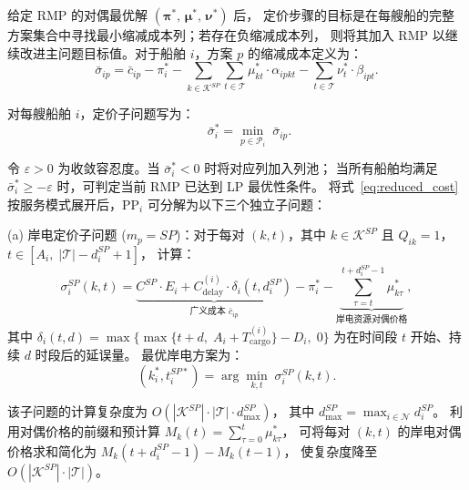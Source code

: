 \documentclass[UTF8, a4paper, 12pt]{ctexart}
\theoremstyle{plain}
\theoremstyle{definition}
\theoremstyle{remark}
\begin{document}
给定 RMP 的对偶最优解 $(\boldsymbol{\pi}^*,\, \boldsymbol{\mu}^*,\, \boldsymbol{\nu}^*)$ 后，
定价步骤的目标是在每艘船的完整方案集合中寻找最小缩减成本列；若存在负缩减成本列，
则将其加入 RMP 以继续改进主问题目标值。对于船舶 $i$，方案 $p$ 的缩减成本定义为：
\begin{equation}
  \bar{\sigma}_{ip}
  = \bar{c}_{ip}
  - \pi_i^*
  - \sum_{k \in \mathcal{K}^{SP}} \sum_{t \in \mathcal{T}}
    \mu_{kt}^* \cdot \alpha_{ipkt}
  - \sum_{t \in \mathcal{T}} \nu_t^* \cdot \beta_{ipt}.
  \label{eq:reduced_cost}
\end{equation}

对每艘船舶 $i$，定价子问题写为：
\begin{equation}
  [\text{PP}_i] \qquad
  \bar{\sigma}_i^* =
  \min_{p \in \mathcal{P}_i} \; \bar{\sigma}_{ip}.
  \label{eq:pricing}
\end{equation}

令 $\varepsilon>0$ 为收敛容忍度。当 $\bar{\sigma}_i^*<0$ 时将对应列加入列池；
当所有船舶均满足 $\bar{\sigma}_i^*\ge -\varepsilon$ 时，可判定当前 RMP 已达到 LP 最优性条件。
将式~\eqref{eq:reduced_cost} 按服务模式展开后，$\text{PP}_i$ 可分解为以下三个独立子问题：

\medskip
\noindent(a) 岸电定价子问题
($m_p = SP$)：对于每对 $(k, t)$，其中 $k \in \mathcal{K}^{SP}$
且 $Q_{ik} = 1$，$t \in [A_i,\; |\mathcal{T}| - d_i^{SP} + 1]$，
计算：
\begin{equation}
  \sigma_i^{SP}(k, t)
  = \underbrace{C^{SP} \cdot E_i + C_{\text{delay}}^{(i)} \cdot \delta_i(t, d_i^{SP})}_{
    \text{广义成本 } \bar{c}_{ip}}
  - \pi_i^*
  - \underbrace{\sum_{\tau = t}^{t + d_i^{SP} - 1} \mu_{k\tau}^*}_{
    \text{岸电资源对偶价格}},
  \label{eq:price_sp}
\end{equation}
其中 $\delta_i(t, d) = \max\!\big\{\max\{t + d,\; A_i + T_{\text{cargo}}^{(i)}\} - D_i,\; 0\big\}$
为在时间段 $t$ 开始、持续 $d$ 时段后的延误量。
最优岸电方案为：
\begin{equation}
  (k_i^*, t_i^{SP*}) = \arg\min_{k, t} \; \sigma_i^{SP}(k, t).
  \label{eq:price_sp_opt}
\end{equation}

\noindent
该子问题的计算复杂度为 $O(|\mathcal{K}^{SP}| \cdot |\mathcal{T}| \cdot d_{\max}^{SP})$，
其中 $d_{\max}^{SP}=\max_{i \in \mathcal{N}} d_i^{SP}$。
利用对偶价格的前缀和预计算
$M_{k}(t) = \sum_{\tau=0}^{t} \mu_{k\tau}^*$，
可将每对 $(k, t)$ 的岸电对偶价格求和简化为
$M_{k}(t + d_i^{SP} - 1) - M_{k}(t - 1)$，
使复杂度降至 $O(|\mathcal{K}^{SP}| \cdot |\mathcal{T}|)$。
\end{document}
